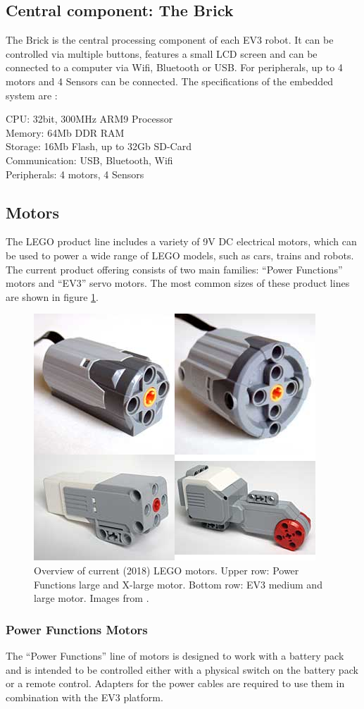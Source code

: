 \documentclass[11pt, a4paper]{article}
\begin{document}
\subsection{Central component: The Brick}
The Brick is the central processing component of each EV3 robot. It can be controlled via multiple buttons, features a small LCD screen and can be connected to a computer via Wifi, Bluetooth or USB. For peripherals, up to 4 motors and 4 Sensors can be connected. The specifications of the embedded system are \cite{ev3_dev_toolkit}:
\begin{listing}
	CPU: 32bit, 300MHz ARM9 Processor \\
	Memory: 64Mb DDR RAM\\
	Storage: 16Mb Flash, up to 32Gb SD-Card \\
	Communication: USB, Bluetooth, Wifi \\
	Peripherals: 4 motors, 4 Sensors
\end{listing}

\subsection{Motors}
The LEGO product line includes a variety of 9V DC electrical motors, which can be used to power a wide range of LEGO models, such as cars, trains and robots. The current product offering consists of two main families: ``Power Functions'' motors and ``EV3'' servo motors. The most common sizes of these product lines are shown in figure \ref{fig:motors}.

\begin{figure}
	\centering
	\includegraphics[width=0.4\linewidth]{images/motors}
	\caption{Overview of current (2018) LEGO motors. Upper row: Power Functions large and X-large motor. Bottom row: EV3 medium and large motor. Images from \cite{motor_comparison}.}
	\label{fig:motors}
\end{figure}

\subsubsection*{Power Functions Motors}
The ``Power Functions'' line of motors is designed to work with a battery pack and is intended to be controlled either with a physical switch on the battery pack or a remote control. Adapters for the power cables are required to use them in combination with the EV3 platform. \cite{power_fun}
\end{document}
